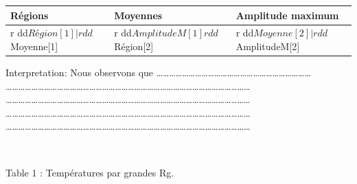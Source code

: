 \documentclass[
]{article}
\begin{document}
\begin{longtable}[]{@{}lll@{}}
\toprule
\begin{minipage}[b]{0.28\columnwidth}\raggedright
Régions\strut
\end{minipage} & \begin{minipage}[b]{0.28\columnwidth}\raggedright
Moyennes\strut
\end{minipage} & \begin{minipage}[b]{0.35\columnwidth}\raggedright
Amplitude maximum\strut
\end{minipage}\tabularnewline
\midrule
\endhead
\begin{minipage}[t]{0.28\columnwidth}\raggedright
r dd\(Région[1] | r dd\)Moyenne{[}1{]}\strut
\end{minipage} & \begin{minipage}[t]{0.28\columnwidth}\raggedright
r dd\(AmplitudeM[1] r dd\)Région{[}2{]}\strut
\end{minipage} & \begin{minipage}[t]{0.35\columnwidth}\raggedright
r dd\(Moyenne[2] | r dd\)AmplitudeM{[}2{]}\strut
\end{minipage}\tabularnewline
\bottomrule
\end{longtable}

Interpretation: Nous observons que
\ldots\ldots\ldots\ldots\ldots\ldots\ldots\ldots\ldots\ldots\ldots\ldots\ldots\ldots\ldots\ldots\ldots\ldots\ldots\ldots\ldots\ldots\ldots\ldots{}
\ldots\ldots\ldots\ldots\ldots\ldots\ldots\ldots\ldots\ldots\ldots\ldots\ldots\ldots\ldots\ldots\ldots\ldots\ldots\ldots\ldots\ldots\ldots\ldots\ldots\ldots\ldots\ldots\ldots\ldots\ldots\ldots\ldots\ldots\ldots\ldots\ldots\ldots{}
\ldots\ldots\ldots\ldots\ldots\ldots\ldots\ldots\ldots\ldots\ldots\ldots\ldots\ldots\ldots\ldots\ldots\ldots\ldots\ldots\ldots\ldots\ldots\ldots\ldots\ldots\ldots\ldots\ldots\ldots\ldots\ldots\ldots\ldots\ldots\ldots\ldots\ldots{}
\ldots\ldots\ldots\ldots\ldots\ldots\ldots\ldots\ldots\ldots\ldots\ldots\ldots\ldots\ldots\ldots\ldots\ldots\ldots\ldots\ldots\ldots\ldots\ldots\ldots\ldots\ldots\ldots\ldots\ldots\ldots\ldots\ldots\ldots\ldots\ldots\ldots\ldots{}
\ldots\ldots\ldots\ldots\ldots\ldots\ldots\ldots\ldots\ldots\ldots\ldots\ldots\ldots\ldots\ldots\ldots\ldots\ldots\ldots\ldots\ldots\ldots\ldots\ldots\ldots\ldots\ldots\ldots\ldots\ldots\ldots\ldots\ldots\ldots\ldots\ldots\ldots{}

~

\begin{center}Table 1 : Températures par grandes Rg.\end{center}
\end{document}
